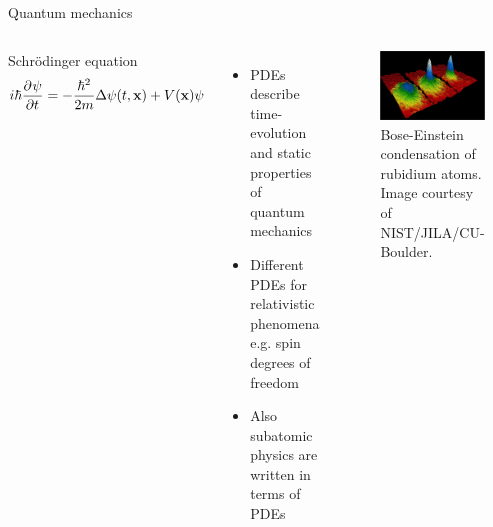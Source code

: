 \begin{frame}{Quantum mechanics}
	\centering
	\begin{columns}[T,onlytextwidth]
		Schrödinger equation
		$$
			i \hbar \frac{\partial^{} \psi}{\partial t^{}} = -\frac{\hbar^2}{2m} \Delta \psi (t,\mathbf{x}) + V(\mathbf{x}) \psi
		$$
		\begin{itemize}
			\item PDEs describe time-evolution and static properties of quantum mechanics
			\item Different PDEs for relativistic phenomena e.g. spin degrees of freedom
			\item Also subatomic physics are written in terms of PDEs
		\end{itemize}
		
		\begin{figure}
			\includegraphics[width=0.8\linewidth]{BE_condensation.jpg}
			\caption{Bose-Einstein condensation of rubidium atoms. Image courtesy of NIST/JILA/CU-Boulder.}
		\end{figure}
	\end{columns}
\end{frame}



